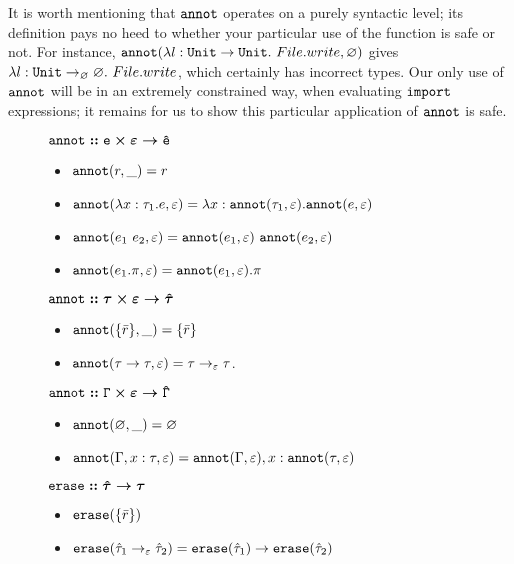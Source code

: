 It is worth mentioning that $\mathtt{annot}$ operates on a purely syntactic level; its definition pays no heed to whether your particular use of the function is safe or not. For instance, $\mathtt{annot}(\lambda l: \mathtt{Unit} \rightarrow \mathtt{Unit}. ~ File.write, \varnothing)$ gives $\lambda l: \mathtt{Unit} \rightarrow_{\varnothing} \varnothing.~File.write$, which certainly has incorrect types. Our only use of $\mathtt{annot}$ will be in an extremely constrained way, when evaluating $\mathtt{import}$ expressions; it remains for us to show this particular application of $\mathtt{annot}$ is safe.

\begin{figure}[h]
\vspace{-5pt}

$\bm{\mathtt{annot :: e \times \varepsilon \rightarrow \hat e}}$

\begin{itemize}
	\setlength\itemsep{-0.7em}
	\item[] $\mathtt{annot}(r, \_) = r$
	\item[] $\mathtt{annot}(\lambda x: \tau_1 . e, \varepsilon) = \lambda x: \mathtt{annot}(\tau_1, \varepsilon) . \mathtt{annot}(e, \varepsilon)$
	\item[] $\mathtt{annot}(e_1~e_2, \varepsilon) = \mathtt{annot}(e_1, \varepsilon)~\mathtt{annot}(e_2, \varepsilon)$
	\item[] $\mathtt{annot}(e_1.\pi, \varepsilon) = \mathtt{annot}(e_1, \varepsilon).\pi$
\end{itemize}
	
$\bm{\mathtt{annot :: \tau \times \varepsilon \rightarrow \hat \tau}}$

\begin{itemize}
	\setlength\itemsep{-0.7em}
	\item[] $\mathtt{annot}(\{ \bar r \}, \_) = \{ \bar r \}$
	\item[] $\mathtt{annot}(\tau \rightarrow \tau, \varepsilon) = \tau \rightarrow_{\varepsilon} \tau$.	
\end{itemize}

$\bm{\mathtt{annot :: \Gamma \times \varepsilon \rightarrow \hat \Gamma}}$

\begin{itemize}
	\setlength\itemsep{-0.7em}
	\item[] $\mathtt{annot}(\varnothing, \_) = \varnothing$
	\item[] $\mathtt{annot}(\Gamma, x: \tau, \varepsilon) = \mathtt{annot}(\Gamma, \varepsilon), x: \mathtt{annot}(\tau, \varepsilon)$
\end{itemize}

$\bm{\mathtt{erase :: \hat \tau \rightarrow \tau}}$
\begin{itemize}
	\setlength\itemsep{-0.7em}
	\item[] $\mathtt{erase}(\{ \bar r \})$
	\item[] $\mathtt{erase}(\hat \tau_1 \rightarrow_{\varepsilon} \hat \tau_2) = \mathtt{erase}(\hat \tau_1) \rightarrow \mathtt{erase}(\hat \tau_2)$
\end{itemize}


\end{figure}
